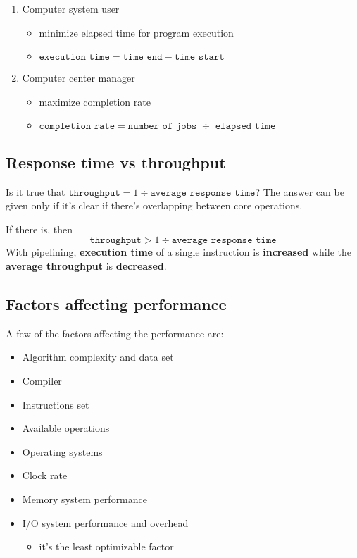 \documentclass[english]{article}
\begin{document}
\begin{enumerate}
  \item Computer system user
        \begin{itemize}
          \item minimize elapsed time for program execution
          \item \(\texttt{execution\ time} = \texttt{time\_end} - \texttt{time\_start}\)
        \end{itemize}
  \item Computer center manager
        \begin{itemize}
          \item maximize completion rate
          \item \(\texttt{completion\ rate} = \texttt{number\ of\ jobs } \div \texttt{ elapsed\ time}\)
        \end{itemize}
\end{enumerate}

\subsection{Response time vs throughput}

Is it true that
\(\texttt{throughput} = {1} \div { \texttt{average\ response\ time}}\)?
The answer can be given only if it's clear if there's overlapping between core operations.

If there is, then \[ \texttt{throughput} > {1} \div {\texttt{average\ response\ time}} \]
With pipelining, \textbf{execution time} of a single instruction is \textbf{increased} while the \textbf{average throughput} is \textbf{decreased}.

\subsection{Factors affecting performance}

A few of the factors affecting the performance are:

\begin{itemize}
  \item Algorithm complexity and data set
  \item Compiler
  \item Instructions set
  \item Available operations
  \item Operating systems
  \item Clock rate
  \item Memory system performance
  \item I/O system performance and overhead
        \begin{itemize}[label=\(\rightarrow\)]
          \item it's the least optimizable factor
        \end{itemize}
\end{itemize}
\end{document}
